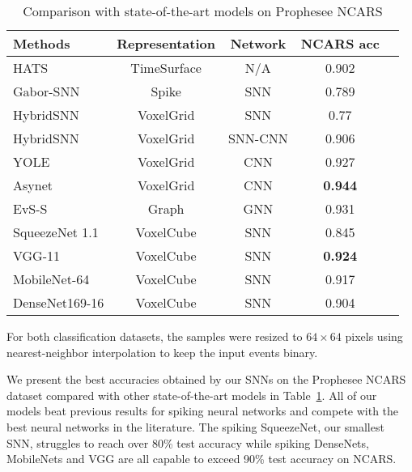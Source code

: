 \documentclass[conference]{IEEEtran}
\begin{document}
\begin{table}[]
\renewcommand{\arraystretch}{1.3}
\centering
\caption{Comparison with state-of-the-art models on Prophesee NCARS}
\begin{tabular}{lcccc}
\hline
\textbf{Methods}     & \textbf{Representation}     & \textbf{Network}   & \textbf{NCARS acc}\\ \hline
HATS \cite{ncars}       & TimeSurface   & N/A          & 0.902                        \\
Gabor-SNN \cite{ncars}   & Spike         & SNN       & 0.789                   \\
HybridSNN \cite{hybridsnn} & VoxelGrid  & SNN       & 0.77            \\
HybridSNN \cite{hybridsnn} & VoxelGrid  & SNN-CNN       & 0.906            \\
YOLE \cite{yole}       & VoxelGrid     & CNN          & 0.927                         \\
Asynet \cite{asynet}     & VoxelGrid     & CNN       & \textbf{0.944}                       \\
EvS-S \cite{graph} & Graph  & GNN       & 0.931                   \\
\hline
SqueezeNet 1.1 & VoxelCube & SNN       & 0.845                       \\ 
VGG-11 & VoxelCube & SNN       & \textbf{0.924}                       \\ 
MobileNet-64 & VoxelCube & SNN       & 0.917                       \\ 
DenseNet169-16 & VoxelCube & SNN       & 0.904                       \\ 
\hline
\end{tabular}
\label{tab:ncars}
\end{table}

For both classification datasets, the samples were resized to $64 \times 64$ pixels using nearest-neighbor interpolation to keep the input events binary.

We present the best accuracies obtained by our SNNs on the Prophesee NCARS dataset compared with other state-of-the-art models in Table~\ref{tab:ncars}. All of our models beat previous results for spiking neural networks and compete with the best neural networks in the literature. The spiking SqueezeNet, our smallest SNN, struggles to reach over 80\% test accuracy while spiking DenseNets, MobileNets and VGG are all capable to exceed 90\% test accuracy on NCARS. 
\end{document}
